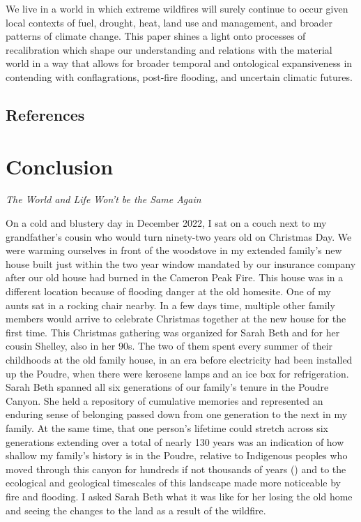 \documentclass[
]{article}
\begin{document}
We live in a world in which extreme wildfires will surely continue to occur given local contexts of fuel, drought, heat, land use and management, and broader patterns of climate change. This paper shines a light onto processes of recalibration which shape our understanding and relations with the material world in a way that allows for broader temporal and ontological expansiveness in contending with conflagrations, post-fire flooding, and uncertain climatic futures.

\subsection{References}\label{references-3}

\clearpage

\section{Conclusion}\label{conclusion}

\emph{The World and Life Won't be the Same Again}

On a cold and blustery day in December 2022, I sat on a couch next to my grandfather's cousin who would turn ninety-two years old on Christmas Day. We were warming ourselves in front of the woodstove in my extended family's new house built just within the two year window mandated by our insurance company after our old house had burned in the Cameron Peak Fire. This house was in a different location because of flooding danger at the old homesite. One of my aunts sat in a rocking chair nearby. In a few days time, multiple other family members would arrive to celebrate Christmas together at the new house for the first time. This Christmas gathering was organized for Sarah Beth and for her cousin Shelley, also in her 90s. The two of them spent every summer of their childhoods at the old family house, in an era before electricity had been installed up the Poudre, when there were kerosene lamps and an ice box for refrigeration. Sarah Beth spanned all six generations of our family's tenure in the Poudre Canyon. She held a repository of cumulative memories and represented an enduring sense of belonging passed down from one generation to the next in my family. At the same time, that one person's lifetime could stretch across six generations extending over a total of nearly 130 years was an indication of how shallow my family's history is in the Poudre, relative to Indigenous peoples who moved through this canyon for hundreds if not thousands of years () and to the ecological and geological timescales of this landscape made more noticeable by fire and flooding. I asked Sarah Beth what it was like for her losing the old home and seeing the changes to the land as a result of the wildfire.
\end{document}
